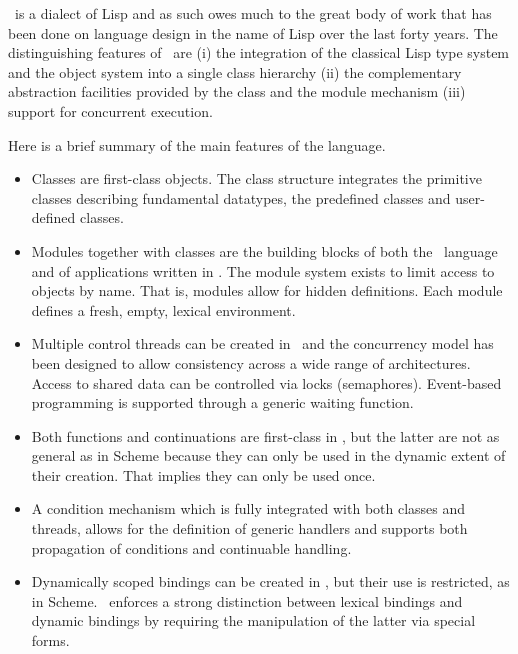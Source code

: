 \begin{introduction}
\begin{optDefinition}
\eulisp\ is a dialect of Lisp and as such owes much to the great body of work
that has been done on language design in the name of Lisp over the last forty
years.  The distinguishing features of \eulisp\ are (i) the integration of the
classical Lisp type system and the object system into a single class hierarchy
(ii) the complementary abstraction facilities provided by the class and the
module mechanism (iii) support for concurrent execution.

Here is a brief summary of the main features of the language.
\begin{itemize}

    \item Classes are first-class objects.  The class
    structure integrates the primitive classes
    describing fundamental datatypes, the predefined classes and user-defined
    classes.

    \item Modules together with classes are the building
    blocks of both the \eulisp\ language and of applications written in \eulisp.
    The module system exists to limit access to objects by name.  That is,
    modules allow for hidden definitions.  Each module defines a fresh, empty,
    lexical environment.

    \item Multiple control threads can be created in \eulisp\ and the
    concurrency model has been designed to allow consistency across a wide range
    of architectures.  Access to shared data can be controlled via locks
    (semaphores). Event-based programming is supported through a generic waiting
    function.

    \item Both functions and continuations are first-class in \eulisp, but the
    latter are not as general as in Scheme because they can only be used in the
    dynamic extent of their creation.  That implies they can only be used once.

    \item A condition mechanism which is fully integrated with both classes and
    threads, allows for the definition of generic handlers and supports both
    propagation of conditions and continuable handling.

    \item Dynamically scoped bindings
    can be created in \eulisp, but their use is restricted, as in Scheme.
    \eulisp\ enforces a strong distinction between lexical bindings and dynamic
    bindings by requiring the manipulation of the latter via special forms.


\end{itemize}
\end{optDefinition}
\end{introduction}
